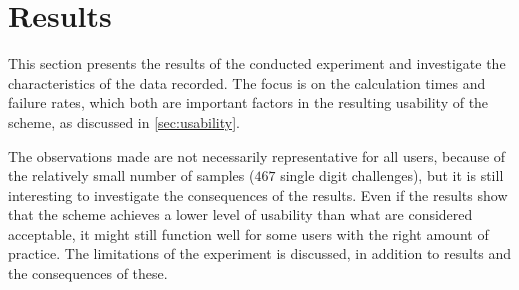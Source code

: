\section{Results}

This section presents the results of the conducted experiment and investigate the characteristics of the data recorded. The focus is on the calculation times and failure rates, which both are important factors in the resulting usability of the scheme, as discussed in \autoref{sec:usability}.
\par The observations made are not necessarily representative for all users, because of the relatively small number of samples ($467$ single digit challenges), but it is still interesting to investigate the consequences of the results. Even if the results show that the scheme achieves a lower level of usability than what are considered acceptable, it might still function well for some users with the right amount of practice. The limitations of the experiment is discussed, in addition to results and the consequences of these.

